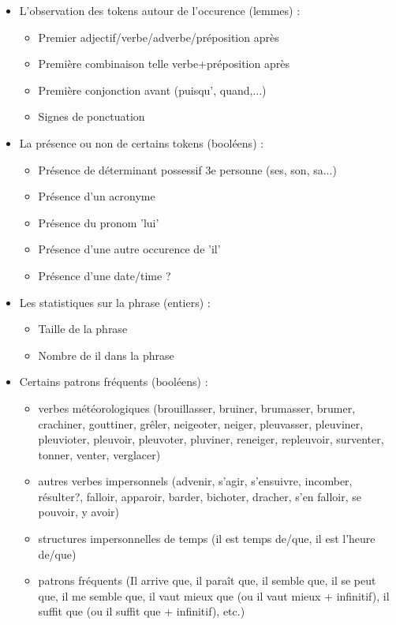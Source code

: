\documentclass[a4paper,12pt]{article}
\begin{document}
\begin{itemize}
 \item[\textbullet] L'observation des tokens autour de l'occurence (lemmes) :
 \begin{itemize}
  \item Premier adjectif/verbe/adverbe/préposition après
  \item Première combinaison telle verbe+préposition après
  \item Première conjonction avant (puisqu', quand,...)
  \item Signes de ponctuation
 \end{itemize}
 \item[\textbullet] La présence ou non de certains tokens (booléens) :
 \begin{itemize}
  \item Présence de déterminant possessif 3e personne (ses, son, sa...)
  \item Présence d'un acronyme
  \item Présence du pronom 'lui'
  \item Présence d'une autre occurence de 'il'
  \item Présence d'une date/time ?
 \end{itemize}
 \item[\textbullet] Les statistiques sur la phrase (entiers) :
 \begin{itemize}
  \item Taille de la phrase
  \item Nombre de \og{}il\fg{} dans la phrase
 \end{itemize}
 \item[\textbullet] Certains patrons fréquents (booléens) :
 \begin{itemize}
  \item verbes météorologiques (brouillasser, bruiner, brumasser, brumer, crachiner, gouttiner, grêler, neigeoter, neiger, pleuvasser, pleuviner, pleuvioter, pleuvoir, pleuvoter,  pluviner, reneiger, repleuvoir, surventer, tonner, venter, verglacer)
  \item autres verbes impersonnels (advenir, s'agir, s'ensuivre, incomber, résulter?, falloir, apparoir, barder, bichoter, dracher, s'en falloir, se pouvoir, y avoir)
  \item structures impersonnelles de temps (il est temps de/que, il est l'heure de/que)
  \item patrons fréquents (Il arrive que, il paraît que, il semble que, il se peut que, il me semble que, il vaut mieux que (ou il vaut mieux + infinitif), il suffit que (ou il suffit que + infinitif), etc.)

\end{itemize}
\end{itemize}
\end{document}
